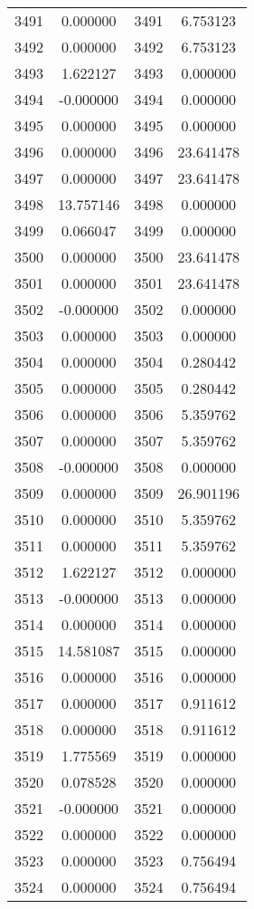 \documentclass[12pt]{article}
\begin{document}
\begin{longtable}{@{}cccc@{}}
3491 & 0.000000 & 3491 & 6.753123 \\
3492 & 0.000000 & 3492 & 6.753123 \\
3493 & 1.622127 & 3493 & 0.000000 \\
3494 & -0.000000 & 3494 & 0.000000 \\
3495 & 0.000000 & 3495 & 0.000000 \\
3496 & 0.000000 & 3496 & 23.641478 \\
3497 & 0.000000 & 3497 & 23.641478 \\
3498 & 13.757146 & 3498 & 0.000000 \\
3499 & 0.066047 & 3499 & 0.000000 \\
3500 & 0.000000 & 3500 & 23.641478 \\
3501 & 0.000000 & 3501 & 23.641478 \\
3502 & -0.000000 & 3502 & 0.000000 \\
3503 & 0.000000 & 3503 & 0.000000 \\
3504 & 0.000000 & 3504 & 0.280442 \\
3505 & 0.000000 & 3505 & 0.280442 \\
3506 & 0.000000 & 3506 & 5.359762 \\
3507 & 0.000000 & 3507 & 5.359762 \\
3508 & -0.000000 & 3508 & 0.000000 \\
3509 & 0.000000 & 3509 & 26.901196 \\
3510 & 0.000000 & 3510 & 5.359762 \\
3511 & 0.000000 & 3511 & 5.359762 \\
3512 & 1.622127 & 3512 & 0.000000 \\
3513 & -0.000000 & 3513 & 0.000000 \\
3514 & 0.000000 & 3514 & 0.000000 \\
3515 & 14.581087 & 3515 & 0.000000 \\
3516 & 0.000000 & 3516 & 0.000000 \\
3517 & 0.000000 & 3517 & 0.911612 \\
3518 & 0.000000 & 3518 & 0.911612 \\
3519 & 1.775569 & 3519 & 0.000000 \\
3520 & 0.078528 & 3520 & 0.000000 \\
3521 & -0.000000 & 3521 & 0.000000 \\
3522 & 0.000000 & 3522 & 0.000000 \\
3523 & 0.000000 & 3523 & 0.756494 \\
3524 & 0.000000 & 3524 & 0.756494 \\

\end{longtable}
\end{document}
